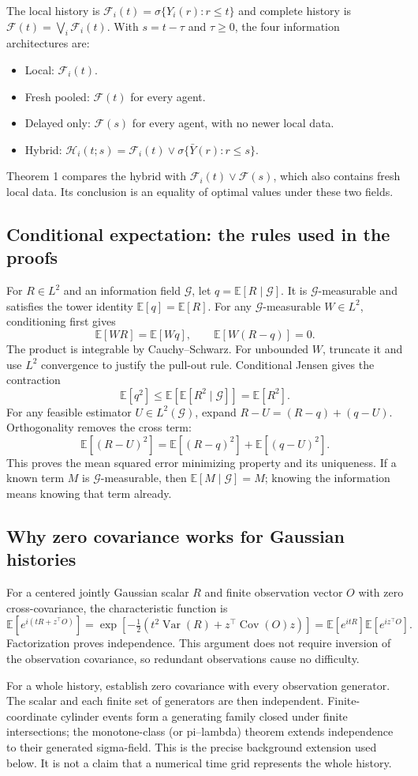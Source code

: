 \documentclass[12pt,letterpaper]{article}
\newcommand{\E}{\mathbb E}
\newcommand{\Var}{\operatorname{Var}}
\newcommand{\Cov}{\operatorname{Cov}}
\newcommand{\G}{\mathcal G}
\newcommand{\F}{\mathcal F}
\newcommand{\HH}{\mathcal H}
\begin{document}
The local history is $\F_i(t)=\sigma\{Y_i(r):r\le t\}$ and complete history is $\F(t)=\bigvee_i\F_i(t)$. With $s=t-\tau$ and $\tau\ge0$, the four information architectures are:
\begin{itemize}
\item Local: $\F_i(t)$.
\item Fresh pooled: $\F(t)$ for every agent.
\item Delayed only: $\F(s)$ for every agent, with no newer local data.
\item Hybrid: $\HH_i(t;s)=\F_i(t)\vee\sigma\{\bar Y(r):r\le s\}$.
\end{itemize}
Theorem 1 compares the hybrid with $\F_i(t)\vee\F(s)$, which also contains fresh local data. Its conclusion is an equality of optimal values under these two fields.

\subsection{Conditional expectation: the rules used in the proofs}
For $R\in L^2$ and an information field $\G$, let $q=\E[R\mid\G]$. It is $\G$-measurable and satisfies the tower identity $\E[q]=\E[R]$. For any $\G$-measurable $W\in L^2$, conditioning first gives
\[
\E[WR]=\E[Wq],\qquad \E[W(R-q)]=0.
\]
The product is integrable by Cauchy--Schwarz. For unbounded $W$, truncate it and use $L^2$ convergence to justify the pull-out rule. Conditional Jensen gives the contraction
\[
\E[q^2]\le\E[\E[R^2\mid\G]]=\E[R^2].
\]
For any feasible estimator $U\in L^2(\G)$, expand $R-U=(R-q)+(q-U)$. Orthogonality removes the cross term:
\[
\E[(R-U)^2]=\E[(R-q)^2]+\E[(q-U)^2].
\]
This proves the mean squared error minimizing property and its uniqueness. If a known term $M$ is $\G$-measurable, then $\E[M\mid\G]=M$; knowing the information means knowing that term already.

\subsection{Why zero covariance works for Gaussian histories}
For a centered jointly Gaussian scalar $R$ and finite observation vector $O$ with zero cross-covariance, the characteristic function is
\[
\E[e^{i(tR+z^\top O)}]
=\exp[-\tfrac12(t^2\Var(R)+z^\top\Cov(O)z)]
=\E[e^{itR}]\E[e^{iz^\top O}].
\]
Factorization proves independence. This argument does not require inversion of the observation covariance, so redundant observations cause no difficulty.

For a whole history, establish zero covariance with every observation generator. The scalar and each finite set of generators are then independent. Finite-coordinate cylinder events form a generating family closed under finite intersections; the monotone-class (or pi--lambda) theorem extends independence to their generated sigma-field. This is the precise background extension used below. It is not a claim that a numerical time grid represents the whole history.
\end{document}
